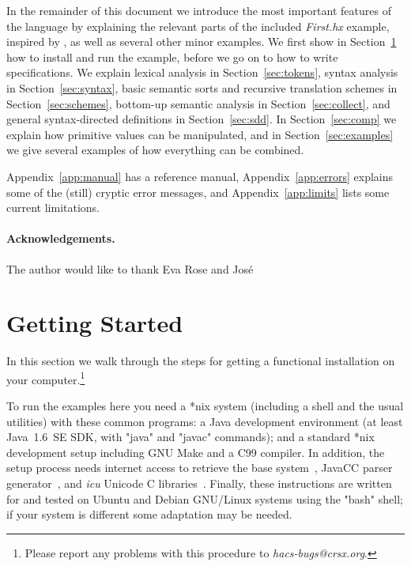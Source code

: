 \documentclass[11pt]{article} %
\begin{document}
In the remainder of this document we introduce the most important features of the \HAX language by
explaining the relevant parts of the included \emph{First.hx} example, inspired by
\cite[Figure~1.7]{Aho+:2006}, as well as several other minor examples. %
We first show in Section~\ref{sec:run} how to install \HAX and run the example, before we go on to
how to write specifications. %
We explain lexical analysis in Section~\ref{sec:tokens}, %
syntax analysis in Section~\ref{sec:syntax}, %
basic semantic sorts and recursive translation schemes in Section~\ref{sec:schemes}, %
bottom-up semantic analysis in Section~\ref{sec:collect}, %
and general syntax-directed definitions in Section~\ref{sec:sdd}. %
In Section~\ref{sec:comp} we explain how primitive values can be manipulated, %
and in Section~\ref{sec:examples} we give several examples of how everything can be combined.

Appendix~\ref{app:manual} has a reference manual, %
Appendix~\ref{app:errors} explains some of the (still) cryptic error messages, %
and Appendix~\ref{app:limits} lists some current limitations.

\paragraph*{Acknowledgements.} The author would like to thank Eva Rose and José


\section{Getting Started}\label{sec:run}

In this section we walk through the steps for getting a functional \HAX installation on your
computer.\footnote{Please report any problems with this procedure to \emph{hacs-bugs@crsx.org}.}

\begin{requirements}
  To run the \HAX examples here you need a *nix system (including a shell and the usual utilities)
  with these common programs: a Java development environment (at least Java~1.6~SE SDK, with "java"
  and "javac" commands); and a standard *nix development setup including GNU Make and a C99
  compiler. In addition, the setup process needs internet access to retrieve the \CRSX base
  system~\cite{crsx}, JavaCC parser generator~\cite{JavaCC}, and \emph{icu} Unicode C
  libraries~\cite{ICU}. Finally, these instructions are written for and tested on Ubuntu and Debian
  GNU/Linux systems using the "bash" shell; if your system is different some adaptation may be
  needed.
\end{requirements}
\end{document}
